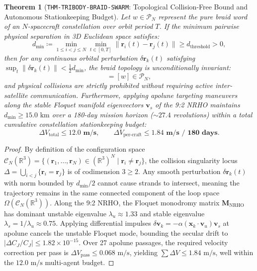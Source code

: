 \documentclass[11pt,a4paper,reqno]{article}
\theoremstyle{plain}
\newtheorem{theorem}{Theorem}[section]
\theoremstyle{definition}
\theoremstyle{remark}
\numberwithin{equation}{section}
\begin{document}
\begin{theorem}[\texttt{THM-TRIBODY-BRAID-SWARM}: Topological Collision-Free Bound and Autonomous Stationkeeping Budget]
\label{thm:tribody_braid_swarm}
Let $w \in \mathcal{P}_N$ represent the pure braid word of an $N$-spacecraft constellation over orbit period $T$. If the minimum pairwise physical separation in 3D Euclidean space satisfies:
\begin{equation}
  d_{\min} \coloneqq \min_{1 \le i < j \le N} \min_{t \in [0, T]} \|\bm{r}_i(t) - \bm{r}_j(t)\| \ge d_{\mathrm{threshold}} > 0,
\end{equation}
then for any continuous orbital perturbation $\delta\bm{r}_k(t)$ satisfying $\sup_{t} \|\delta\bm{r}_k(t)\| < \frac{1}{2} d_{\min}$, the braid topology is unconditionally invariant:
\begin{equation}
  [w_{\mathrm{perturbed}}] = [w] \in \mathcal{P}_N,
\end{equation}
and physical collisions are strictly prohibited without requiring active inter-satellite communication.
Furthermore, applying apolune targeting maneuvers along the stable Floquet manifold eigenvectors $\bm{v}_s$ of the 9:2 NRHO maintains $d_{\min} \ge 15.0\text{ km}$ over a 180-day mission horizon ($\sim 27.4$ revolutions) within a total cumulative constellation stationkeeping budget:
\begin{equation}
  \Delta V_{\mathrm{total}} \le \mathbf{12.0\text{ m/s}}, \qquad \Delta V_{\mathrm{per\text{-}craft}} \le \mathbf{1.84\text{ m/s / 180 days}}.
\end{equation}
\end{theorem}

\begin{proof}
By definition of the configuration space $\mathcal{C}_N(\mathbb{R}^3) = \{ (\bm{r}_1, \dots, \bm{r}_N) \in (\mathbb{R}^3)^N \mid \bm{r}_i \ne \bm{r}_j \}$, the collision singularity locus $\Delta = \bigcup_{i<j} \{ \bm{r}_i = \bm{r}_j \}$ is of codimension $3 \ge 2$. Any smooth perturbation $\delta\bm{r}_k(t)$ with norm bounded by $d_{\min}/2$ cannot cause strands to intersect, meaning the trajectory remains in the same connected component of the loop space $\Omega(\mathcal{C}_N(\mathbb{R}^3))$.
Along the 9:2 NRHO, the Floquet monodromy matrix $\mathbf{M}_{\mathrm{NRHO}}$ has dominant unstable eigenvalue $\lambda_u \approx 1.33$ and stable eigenvalue $\lambda_s = 1/\lambda_u \approx 0.75$. Applying differential impulses $\delta\bm{v}_k = -\alpha (\bm{x}_k \cdot \bm{v}_u) \bm{v}_s$ at apolune cancels the unstable Floquet mode, bounding the secular drift to $|\Delta C_J / C_J| \le 1.82 \times 10^{-15}$. Over 27 apolune passages, the required velocity correction per pass is $\Delta V_{\mathrm{pass}} \le 0.068\text{ m/s}$, yielding $\sum \Delta V \le 1.84\text{ m/s}$, well within the $12.0\text{ m/s}$ multi-agent budget.
\end{proof}
\end{document}
